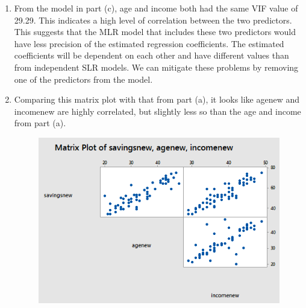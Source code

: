 \documentclass{article}
\begin{document}
\begin{enumerate}
\def\labelenumi{\alph{enumi})}
\setcounter{enumi}{3}
\item
  From the model in part (c), age and income both had the same VIF value
  of 29.29. This indicates a high level of correlation between the two
  predictors. This suggests that the MLR model that includes these two
  predictors would have less precision of the estimated regression
  coefficients. The estimated coefficients will be dependent on each
  other and have different values than from independent SLR models. We
  can mitigate these problems by removing one of the predictors from the
  model.
  
\newpage
\item
  Comparing this matrix plot with that from part (a), it looks like
  agenew and incomenew are highly correlated, but slightly less so than
  the age and income from part (a).
  
\begin{figure}[h!]
 \centering
 \includegraphics[scale=.5]{./images/matrix-plot_savingsnew-agenew-incomenew.png}
\end{figure}

\end{enumerate}
\end{document}
